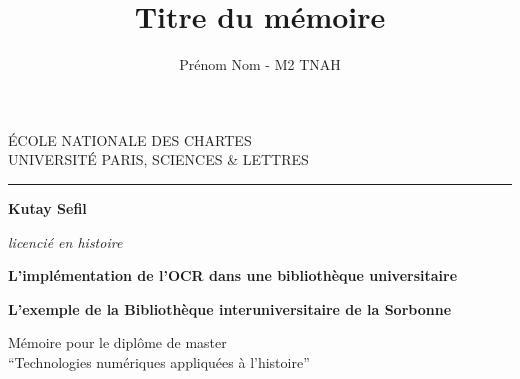 \documentclass[a4paper,12pt,twoside]{book}
\author{Prénom Nom - M2 TNAH}
\title{Titre du mémoire}
\begin{document}
	\begin{titlepage}
		\begin{center}
			
			\bigskip
			
			\begin{large}				
				ÉCOLE NATIONALE DES CHARTES\\
				UNIVERSITÉ PARIS, SCIENCES \& LETTRES
			\end{large}
			\begin{center}\rule{2cm}{0.02cm}\end{center}
			
			\bigskip
			\bigskip
			\bigskip
			\begin{Large}
				\textbf{Kutay Sefil}\\
			\end{Large}
			\begin{normalsize} \textit{licencié en histoire}\\
				
			\end{normalsize}
			
			\bigskip
			\bigskip
			\bigskip
			
			\begin{Huge}
				\textbf{L’implémentation de l’OCR dans une bibliothèque universitaire}\\
			\end{Huge}
			\bigskip
			\bigskip
			\begin{LARGE}
				\textbf{L’exemple de la Bibliothèque interuniversitaire de la Sorbonne}\\
			\end{LARGE}
			
			\bigskip
			\bigskip
			\bigskip
			\begin{large}
			\end{large}
			\vfill
			
			\begin{large}
				Mémoire 
				pour le diplôme de master \\
				\enquote{Technologies numériques appliquées à l'histoire} \\
			\end{large}
			
		\end{center}
	\end{titlepage}

	\thispagestyle{empty}	
	\cleardoublepage
	
\frontmatter
\end{document}
